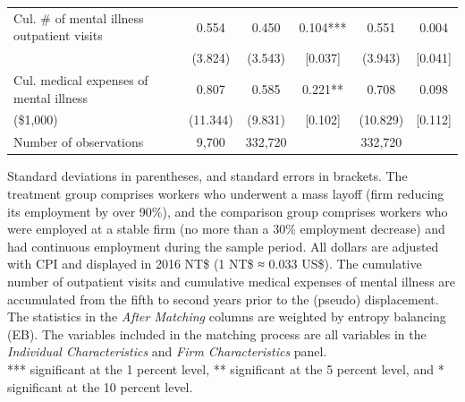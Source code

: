 \documentclass[12pt]{article}
\begin{document}
\begin{table}[htbp]
{\begin{tabular}{lccccc}
    Cul. \# of mental illness outpatient visits & 0.554 & 0.450 & 0.104*** & 0.551 & 0.004 \\
          & (3.824) & (3.543) & [0.037] & (3.943) & [0.041] \\

    Cul. medical expenses of mental illness & 0.807 & 0.585 & 0.221** & 0.708 & 0.098 \\
         (\$1,000) & (11.344) & (9.831) & [0.102] & (10.829) & [0.112] \\

          \midrule \midrule
    Number of observations & 9,700 & 332,720 &       & 332,720 &  \\
\bottomrule
    \end{tabular}%
}
  \label{tab:t1}%
\end{table}%
\vspace{-2em}
\begin{singlespace}
        \begin{footnotesize}
        		 Standard deviations in parentheses, and standard errors in brackets. The treatment group comprises workers who underwent a mass layoff (firm reducing its employment by over 90\%), and the comparison group comprises workers who were employed at a stable firm (no more than a 30\% employment decrease) and had continuous employment during the sample period. All dollars are adjusted with CPI and displayed in 2016 NT\$ (1 NT\$ ≈ 0.033 US\$). The cumulative number of outpatient visits and cumulative medical expenses of mental illness are accumulated from the fifth to second years prior to the (pseudo) displacement. The statistics in the {\it After Matching} columns are weighted by entropy balancing (EB). The variables included in the matching process are all variables in the {\it Individual Characteristics} and {\it Firm Characteristics} panel. \\
		*** significant at the 1 percent level, ** significant at the 5 percent level, and * significant at the 10 percent level.
        \end{footnotesize}
\end{singlespace}


\newpage
\end{document}
